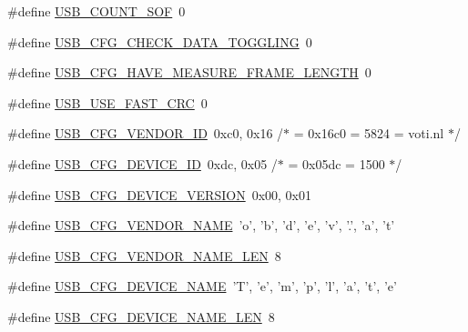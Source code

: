 \begin{DoxyCompactItemize}
\item 
\#define \hyperlink{mhvlib-_vusb-_console_2vusb_2usbconfig-prototype_8h_a93e719c32f721d3e4b2dd5ba776da40b}{U\-S\-B\-\_\-\-C\-O\-U\-N\-T\-\_\-\-S\-O\-F}~0
\item 
\#define \hyperlink{mhvlib-_vusb-_console_2vusb_2usbconfig-prototype_8h_a343f7b4bd7f8ba0348e106ef0f434215}{U\-S\-B\-\_\-\-C\-F\-G\-\_\-\-C\-H\-E\-C\-K\-\_\-\-D\-A\-T\-A\-\_\-\-T\-O\-G\-G\-L\-I\-N\-G}~0
\item 
\#define \hyperlink{mhvlib-_vusb-_console_2vusb_2usbconfig-prototype_8h_a64864300fd8efb3c8d636b5c52f46fe7}{U\-S\-B\-\_\-\-C\-F\-G\-\_\-\-H\-A\-V\-E\-\_\-\-M\-E\-A\-S\-U\-R\-E\-\_\-\-F\-R\-A\-M\-E\-\_\-\-L\-E\-N\-G\-T\-H}~0
\item 
\#define \hyperlink{mhvlib-_vusb-_console_2vusb_2usbconfig-prototype_8h_a056ce5afad0b0620c90bab5bd81e4166}{U\-S\-B\-\_\-\-U\-S\-E\-\_\-\-F\-A\-S\-T\-\_\-\-C\-R\-C}~0
\item 
\#define \hyperlink{mhvlib-_vusb-_console_2vusb_2usbconfig-prototype_8h_a9326b8ec9f809ce66d54349691646930}{U\-S\-B\-\_\-\-C\-F\-G\-\_\-\-V\-E\-N\-D\-O\-R\-\_\-\-I\-D}~0xc0, 0x16 /$\ast$ = 0x16c0 = 5824 = voti.\-nl $\ast$/
\item 
\#define \hyperlink{mhvlib-_vusb-_console_2vusb_2usbconfig-prototype_8h_abc740455309399430b0f49bf7931d1d7}{U\-S\-B\-\_\-\-C\-F\-G\-\_\-\-D\-E\-V\-I\-C\-E\-\_\-\-I\-D}~0xdc, 0x05 /$\ast$ = 0x05dc = 1500 $\ast$/
\item 
\#define \hyperlink{mhvlib-_vusb-_console_2vusb_2usbconfig-prototype_8h_aba3c7c0cd4055ba3bbf5df38e57b6d27}{U\-S\-B\-\_\-\-C\-F\-G\-\_\-\-D\-E\-V\-I\-C\-E\-\_\-\-V\-E\-R\-S\-I\-O\-N}~0x00, 0x01
\item 
\#define \hyperlink{mhvlib-_vusb-_console_2vusb_2usbconfig-prototype_8h_a25a2baf5c8feb0982a47050423add0ec}{U\-S\-B\-\_\-\-C\-F\-G\-\_\-\-V\-E\-N\-D\-O\-R\-\_\-\-N\-A\-M\-E}~'o', 'b', 'd', 'e', 'v', '.', 'a', 't'
\item 
\#define \hyperlink{mhvlib-_vusb-_console_2vusb_2usbconfig-prototype_8h_a3085d820d9dc6e939737a3f1b9a457d7}{U\-S\-B\-\_\-\-C\-F\-G\-\_\-\-V\-E\-N\-D\-O\-R\-\_\-\-N\-A\-M\-E\-\_\-\-L\-E\-N}~8
\item 
\#define \hyperlink{mhvlib-_vusb-_console_2vusb_2usbconfig-prototype_8h_a9b482a2b2740652ffe7dcb6695ca0c91}{U\-S\-B\-\_\-\-C\-F\-G\-\_\-\-D\-E\-V\-I\-C\-E\-\_\-\-N\-A\-M\-E}~'T', 'e', 'm', 'p', 'l', 'a', 't', 'e'
\item 
\#define \hyperlink{mhvlib-_vusb-_console_2vusb_2usbconfig-prototype_8h_ae68f17e6baf13805abc56e74beadeb57}{U\-S\-B\-\_\-\-C\-F\-G\-\_\-\-D\-E\-V\-I\-C\-E\-\_\-\-N\-A\-M\-E\-\_\-\-L\-E\-N}~8

\end{DoxyCompactItemize}
